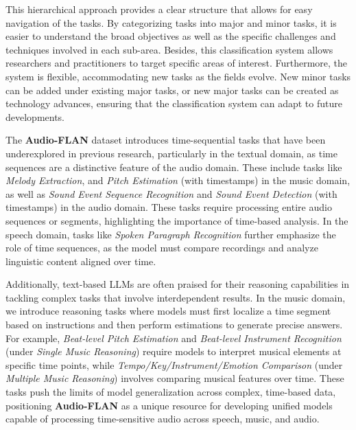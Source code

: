 

This hierarchical approach provides a clear structure that allows for easy navigation of the tasks. By categorizing tasks into major and minor tasks, it is easier to understand the broad objectives as well as the specific challenges and techniques involved in each sub-area.
Besides, this classification system allows researchers and practitioners to target specific areas of interest. 
Furthermore, the system is flexible, accommodating new tasks as the fields evolve. New minor tasks can be added under existing major tasks, or new major tasks can be created as technology advances, ensuring that the classification system can adapt to future developments.


The \textbf{Audio-FLAN} dataset introduces time-sequential tasks that have been underexplored in previous research, particularly in the textual domain, as time sequences are a distinctive feature of the audio domain. These include tasks like \textit{Melody Extraction}, and \textit{Pitch Estimation} (with timestamps) in the music domain, as well as \textit{Sound Event Sequence Recognition} and \textit{Sound Event Detection} (with timestamps) in the audio domain. These tasks require processing entire audio sequences or segments, highlighting the importance of time-based analysis. In the speech domain, tasks like \textit{Spoken Paragraph Recognition} further emphasize the role of time sequences, as the model must compare recordings and analyze linguistic content aligned over time. 

Additionally, text-based LLMs are often praised for their reasoning capabilities in tackling complex tasks that involve interdependent results. In the music domain, we introduce reasoning tasks where models must first localize a time segment based on instructions and then perform estimations to generate precise answers. For example, \textit{Beat-level Pitch Estimation} and \textit{Beat-level Instrument Recognition} (under \textit{Single Music Reasoning}) require models to interpret musical elements at specific time points, while \textit{Tempo/Key/Instrument/Emotion Comparison} (under \textit{Multiple Music Reasoning}) involves comparing musical features over time. These tasks push the limits of model generalization across complex, time-based data, positioning \textbf{Audio-FLAN} as a unique resource for developing unified models capable of processing time-sensitive audio across speech, music, and audio.


